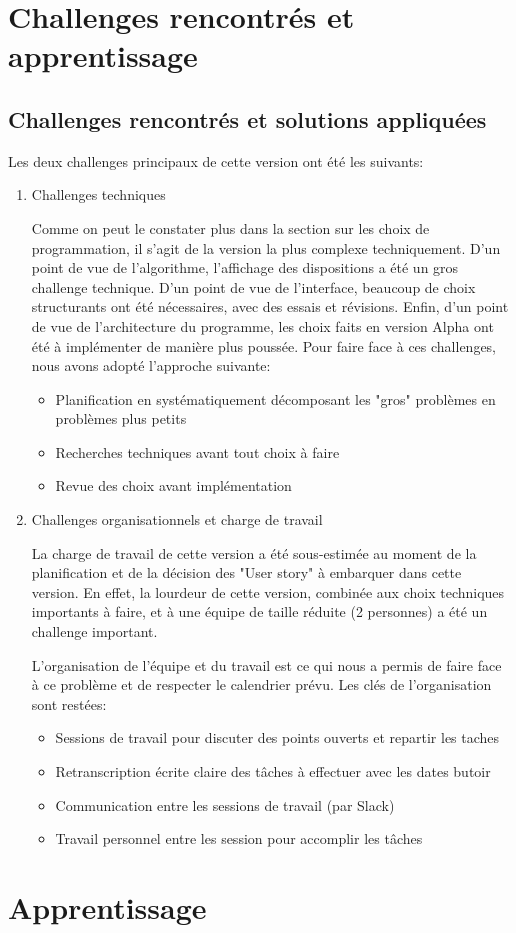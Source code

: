 

\section{Challenges rencontrés et apprentissage}

\subsection{Challenges rencontrés et solutions appliquées}

Les deux challenges principaux de cette version ont été les suivants:
\begin{enumerate}
    \item Challenges techniques
    
          Comme on peut le constater plus dans la section sur les choix de programmation, il s’agit de la version la plus complexe techniquement.
          D’un point de vue de l’algorithme, l’affichage des dispositions a été un gros challenge technique.
          D’un point de vue de l’interface, beaucoup de choix structurants ont été nécessaires, avec des essais et révisions.
          Enfin, d’un point de vue de l’architecture du programme, les choix faits en version Alpha ont été à implémenter de manière plus poussée.
          Pour faire face à ces challenges, nous avons adopté l’approche suivante:
          \begin{itemize}
              \item Planification en systématiquement décomposant les "gros" problèmes en problèmes plus petits
              \item Recherches techniques avant tout choix à faire
              \item Revue des choix avant implémentation
          \end{itemize}
    \item Challenges organisationnels et charge de travail
    
    La charge de travail de cette version a été sous-estimée au moment de la planification et de la décision des "User story" à embarquer 
    dans cette version. En effet, la lourdeur de cette version, combinée aux choix techniques importants à faire, et à une équipe 
    de taille réduite (2 personnes) a été un challenge important.
    
    L’organisation de l'équipe et du travail est ce qui nous a permis de faire face à ce problème et de respecter le calendrier prévu. 
    Les clés de l’organisation sont restées:
    \begin{itemize}
        \item Sessions de travail pour discuter des points ouverts et repartir les taches
        \item Retranscription écrite claire des tâches à effectuer avec les dates butoir
        \item Communication entre les sessions de travail (par Slack)
        \item Travail personnel entre les session pour accomplir les tâches
    \end{itemize}

\end{enumerate}


\section{Apprentissage}

